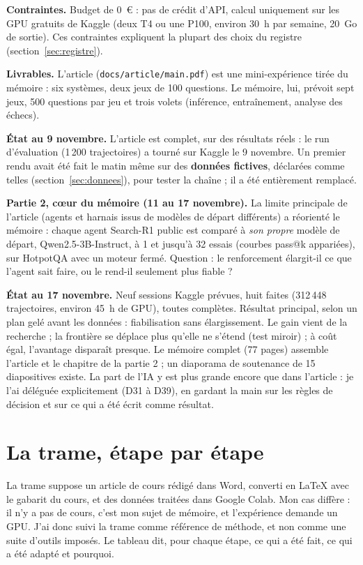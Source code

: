 \documentclass[10pt,a4paper]{article}
\newcommand{\f}[1]{\texttt{\small #1}}
\begin{document}
\textbf{Contraintes.} Budget de 0~€ : pas de crédit d'API, calcul uniquement sur les GPU gratuits de Kaggle (deux T4 ou une P100, environ 30~h par semaine, 20~Go de sortie). Ces contraintes expliquent la plupart des choix du registre (section~\ref{sec:registre}).

\textbf{Livrables.} L'article (\f{docs/article/main.pdf}) est une mini-expérience tirée du mémoire : six systèmes, deux jeux de 100 questions. Le mémoire, lui, prévoit sept jeux, 500 questions par jeu et trois volets (inférence, entraînement, analyse des échecs).

\textbf{État au 9 novembre.} L'article est complet, sur des résultats réels : le run d'évaluation (1\,200 trajectoires) a tourné sur Kaggle le 9 novembre. Un premier rendu avait été fait le matin même sur des \textbf{données fictives}, déclarées comme telles (section~\ref{sec:donnees}), pour tester la chaîne ; il a été entièrement remplacé.

\textbf{Partie 2, cœur du mémoire (11 au 17 novembre).} La limite principale de l'article (agents et harnais issus de modèles de départ différents) a réorienté le mémoire : chaque agent Search-R1 public est comparé à \emph{son propre} modèle de départ, Qwen2.5-3B-Instruct, à 1 et jusqu'à 32 essais (courbes pass@k appariées), sur HotpotQA avec un moteur fermé. Question : le renforcement élargit-il ce que l'agent sait faire, ou le rend-il seulement plus fiable ?

\textbf{État au 17 novembre.} Neuf sessions Kaggle prévues, huit faites (312\,448 trajectoires, environ 45~h de GPU), toutes complètes. Résultat principal, selon un plan gelé avant les données : fiabilisation sans élargissement. Le gain vient de la recherche ; la frontière se déplace plus qu'elle ne s'étend (test miroir) ; à coût égal, l'avantage disparaît presque. Le mémoire complet (77 pages) assemble l'article et le chapitre de la partie 2 ; un diaporama de soutenance de 15 diapositives existe. La part de l'IA y est plus grande encore que dans l'article : je l'ai déléguée explicitement (D31 à D39), en gardant la main sur les règles de décision et sur ce qui a été écrit comme résultat.

\section{La trame, étape par étape}

La trame suppose un article de cours rédigé dans Word, converti en LaTeX avec le gabarit du cours, et des données traitées dans Google Colab. Mon cas diffère : il n'y a pas de cours, c'est mon sujet de mémoire, et l'expérience demande un GPU. J'ai donc suivi la trame comme référence de méthode, et non comme une suite d'outils imposés. Le tableau dit, pour chaque étape, ce qui a été fait, ce qui a été adapté et pourquoi.
\end{document}
